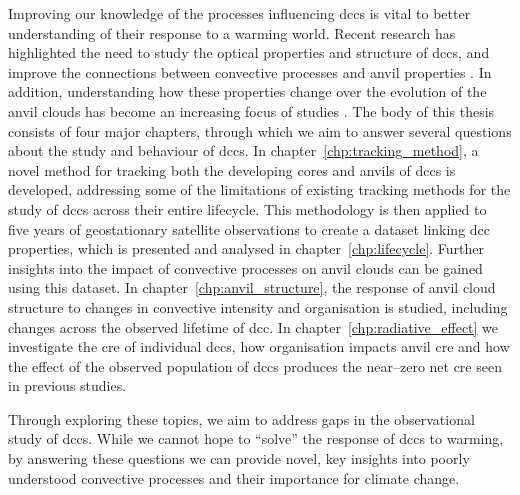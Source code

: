 Improving our knowledge of the processes influencing \acrshort{dcc}s is vital to better understanding of their response to a warming world.
Recent research has highlighted the need to study the optical properties and structure of \acrshort{dcc}s, and improve the connections between convective processes and anvil properties \citep{gasparini_opinion_2023}.
In addition, understanding how these properties change over the evolution of the anvil clouds has become an increasing focus of studies \citep{sokol_tropical_2020, wall_life_2018, bouniol_life_2021}.
The body of this thesis consists of four major chapters, through which we aim to answer several questions about the study and behaviour of \acrshort{dcc}s.
In chapter~\ref{chp:tracking_method}, a novel method for tracking both the developing cores and anvils of \acrshort{dcc}s is developed, addressing some of the limitations of existing tracking methods for the study of \acrshort{dcc}s across their entire lifecycle.
This methodology is then applied to five years of geostationary satellite observations to create a dataset linking \acrshort{dcc} properties, which is presented and analysed in chapter~\ref{chp:lifecycle}.
Further insights into the impact of convective processes on anvil clouds can be gained using this dataset.
In chapter~\ref{chp:anvil_structure}, the response of anvil cloud structure to changes in convective intensity and organisation is studied, including changes across the observed lifetime of \acrshort{dcc}.
In chapter~\ref{chp:radiative_effect} we investigate the \acrshort{cre} of individual \acrshort{dcc}s, how organisation impacts anvil \acrshort{cre} and how the effect of the observed population of \acrshort{dcc}s produces the near--zero net \acrshort{cre} seen in previous studies.

Through exploring these topics, we aim to address gaps in the observational study of \acrshort{dcc}s.
While we cannot hope to ``solve'' the response of \acrshort{dcc}s to warming, by answering these questions we can provide novel, key insights into poorly understood convective processes and their importance for climate change.
